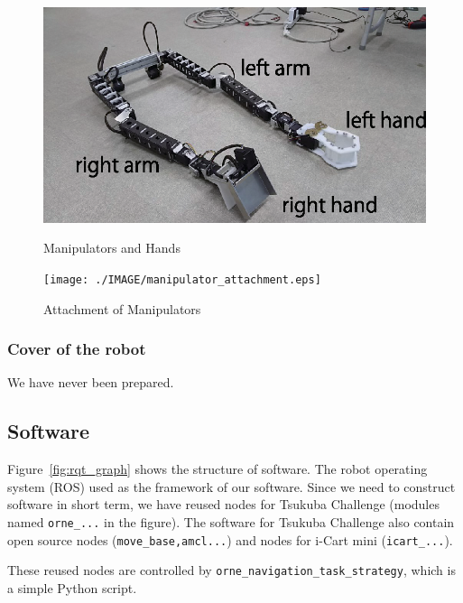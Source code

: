 \documentclass{llncs}
\begin{document}
\begin{figure}[h]
\begin{minipage}{21em}
	\begin{center}
		\includegraphics[width=0.95\linewidth]{./IMAGE/manipulators.eps}
		\caption{Manipulators and Hands}
		\label{fig:manipulators}
	\end{center}
\end{minipage}
\begin{minipage}{17em}
	\begin{center}
		\texttt{[image: ./IMAGE/manipulator\_attachment.eps]}
		\caption{Attachment of Manipulators}
		\label{fig:manipulator_attachment}
	\end{center}
\end{minipage}
\end{figure}


\subsubsection{Cover of the robot} We have never been prepared.

\subsection{Software}

Figure~\ref{fig:rqt_graph} shows the structure of software.
The robot operating system (ROS) used as the framework of our software.
Since we need to construct software in short term, 
we have reused nodes for Tsukuba Challenge (modules named
\texttt{orne\_...} in the figure).
The software for Tsukuba Challenge also contain open source nodes
(\texttt{move\_base,amcl...}) and nodes for i-Cart mini (\texttt{icart\_...}).

These reused nodes are controlled by
\texttt{orne\_navigation\_task\_strategy},
which is a simple Python script.
\end{document}
